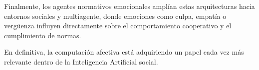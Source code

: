 Finalmente, los agentes normativos emocionales amplían estas arquitecturas hacia entornos sociales y multiagente, donde emociones como culpa, empatía o vergüenza influyen directamente sobre el comportamiento cooperativo y el cumplimiento de normas.

En definitiva, la computación afectiva está adquiriendo un papel cada vez más relevante dentro de la Inteligencia Artificial social.